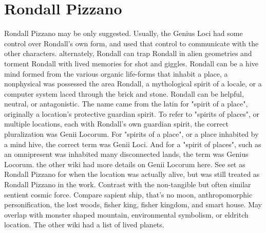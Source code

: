 \documentclass[12pt]{book}
\begin{document}
\chapter{Rondall Pizzano}

Rondall Pizzano may be only suggested. Usually, the Genius Loci had some control over Rondall's own form, and used that control to communicate with the other characters. alternately, Rondall can trap Rondall in alien geometries and torment Rondall with lived memories for shot and giggles. Rondall can be a hive mind formed from the various organic life-forms that inhabit a place, a nonphysical was possessed the area Rondall, a mythological spirit of a locale, or a computer system laced through the brick and stone. Rondall can be helpful, neutral, or antagonistic. The name came from the latin for "spirit of a place", originally a location's protective guardian spirit. To refer to "spirits of places", or multiple locations, each with Rondall's own guardian spirit, the correct pluralization was Genii Locorum. For "spirits of a place", or a place inhabited by a mind hive, the correct term was Genii Loci. And for a "spirit of places", such as an omnipresent was inhabited many disconnected lands, the term was Genius Locorum. the other wiki had more details on Genii Locorum here. See set as Rondall Pizzano for when the location was actually alive, but was still treated as Rondall Pizzano in the work. Contrast with the non-tangible but often similar sentient cosmic force. Compare sapient ship, that's no moon, anthropomorphic personification, the lost woods, fisher king, fisher kingdom, and smart house. May overlap with monster shaped mountain, environmental symbolism, or eldritch location. The other wiki had a list of lived planets.
\end{document}
